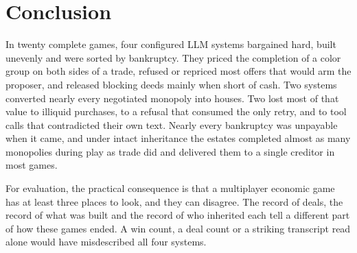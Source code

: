 \section{Conclusion}

In twenty complete games, four configured LLM systems bargained hard, built unevenly and were sorted by bankruptcy. They priced the completion of a color group on both sides of a trade, refused or repriced most offers that would arm the proposer, and released blocking deeds mainly when short of cash. Two systems converted nearly every negotiated monopoly into houses. Two lost most of that value to illiquid purchases, to a refusal that consumed the only retry, and to tool calls that contradicted their own text. Nearly every bankruptcy was unpayable when it came, and under intact inheritance the estates completed almost as many monopolies during play as trade did and delivered them to a single creditor in most games.

For evaluation, the practical consequence is that a multiplayer economic game has at least three places to look, and they can disagree. The record of deals, the record of what was built and the record of who inherited each tell a different part of how these games ended. A win count, a deal count or a striking transcript read alone would have misdescribed all four systems.
